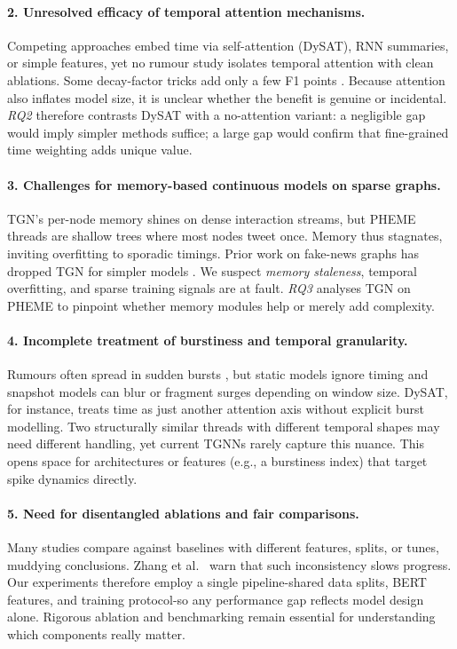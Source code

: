 \documentclass{cshonours}
\begin{document}
\paragraph{2. Unresolved efficacy of temporal attention mechanisms.}
Competing approaches embed time via self-attention (DySAT), RNN summaries, or simple features, yet no rumour study isolates temporal attention with clean ablations. Some decay-factor tricks add only a few F1 points \cite{emnlp-2020-main}. Because attention also inflates model size, it is unclear whether the benefit is genuine or incidental. \emph{RQ2} therefore contrasts DySAT with a no-attention variant: a negligible gap would imply simpler methods suffice; a large gap would confirm that fine-grained time weighting adds unique value.

\paragraph{3. Challenges for memory-based continuous models on sparse graphs.}
TGN's per-node memory shines on dense interaction streams, but PHEME threads are shallow trees where most nodes tweet once. Memory thus stagnates, inviting overfitting to sporadic timings. Prior work on fake-news graphs has dropped TGN for simpler models \cite{zhang2022dynamic}. We suspect \emph{memory staleness}, temporal overfitting, and sparse training signals are at fault. \emph{RQ3} analyses TGN on PHEME to pinpoint whether memory modules help or merely add complexity.

\paragraph{4. Incomplete treatment of burstiness and temporal granularity.}
Rumours often spread in sudden bursts \cite{vosoughi2018spread}, but static models ignore timing and snapshot models can blur or fragment surges depending on window size. DySAT, for instance, treats time as just another attention axis without explicit burst modelling. Two structurally similar threads with different temporal shapes may need different handling, yet current TGNNs rarely capture this nuance. This opens space for architectures or features (e.g., a burstiness index) that target spike dynamics directly.

\paragraph{5. Need for disentangled ablations and fair comparisons.}
Many studies compare against baselines with different features, splits, or tunes, muddying conclusions. Zhang et al.~\cite{zhang2024graph} warn that such inconsistency slows progress. Our experiments therefore employ a single pipeline-shared data splits, BERT features, and training protocol-so any performance gap reflects model design alone. Rigorous ablation and benchmarking remain essential for understanding which components really matter.
\end{document}
